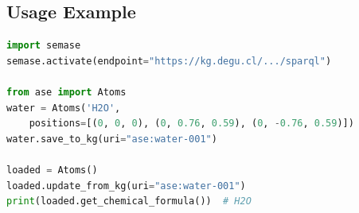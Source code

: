 \subsection{Usage Example}

\begin{lstlisting}[language=Python, caption={\SemASE{} activation and round-trip persistence.}]
import semase
semase.activate(endpoint="https://kg.degu.cl/.../sparql")

from ase import Atoms
water = Atoms('H2O',
    positions=[(0, 0, 0), (0, 0.76, 0.59), (0, -0.76, 0.59)])
water.save_to_kg(uri="ase:water-001")

loaded = Atoms()
loaded.update_from_kg(uri="ase:water-001")
print(loaded.get_chemical_formula())  # H2O
\end{lstlisting}

